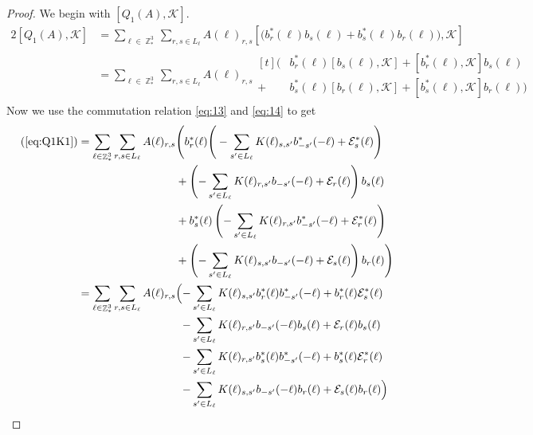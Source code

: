 \documentclass[sn-mathphys, Numbered ,a4paper]{sn-jnl}%
\DeclareMathOperator{\Z}{\mathbb{Z}}
\theoremstyle{plain}
\theoremstyle{definition}
\theoremstyle{remark}
\theoremstyle{plain}
\theoremstyle{definition}
\theoremstyle{remark}
\begin{document}
\begin{proof}We begin with $[Q_1(A),\mathcal{K}]$.
    \begin{alignat}{2}
        [ Q_1(A),\mathcal{K}] &=\sum\limits_{\ell \in \Z^3_*}\sum\limits_{r,s \in L_{\ell}}A(\ell)_{r,s}\left[\Big(b^*_{r}(\ell)b_{s}(\ell) + b^*_{s}(\ell)b_{r}(\ell)\Big),\mathcal{K}\right]\nonumber\\
        &=\sum\limits_{\ell \in \Z^3_*}\sum\limits_{r,s \in L_{\ell}}A(\ell)_{r,s}\begin{aligned}[t]
            \Big(&b^*_{r}(\ell)\left[b_{s}(\ell),\mathcal{K}\right] +\left[b^*_{r}(\ell),\mathcal{K}\right]b_{s}(\ell)\\ + &b^*_{s}(\ell)\left[b_{r}(\ell),\mathcal{K}\right]+ \left[b^*_{s}(\ell),\mathcal{K}\right]b_{r}(\ell)\Big)
        \end{aligned}\label{eq:Q1K1}
    \end{alignat}
Now we use the commutation relation \eqref{eq:13} and \eqref{eq:14} to get
\begin{alignat}{2}
    (\ref{eq:Q1K1})&=\sum\limits_{\ell \in \Z^3_*}\sum\limits_{r,s \in L_{\ell}}A(\ell)_{r,s}\begin{aligned}[t]
        &\Bigg(b^*_{r}(\ell)\Bigg(-\sum\limits_{s'\in L_{\ell}}K(\ell)_{s,s'}b^*_{-s'}(-\ell) + \mathcal{E}^*_{s}(\ell)\Bigg)\\ &+ \left(-\sum\limits_{s'\in L_{\ell}}K(\ell)_{r,s'}b_{-s'}(-\ell) + \mathcal{E}_{r}(\ell)\right)b_{s}(\ell)\\&+ b^*_{s}(\ell)\left(-\sum\limits_{s'\in L_{\ell}}K(\ell)_{r,s'}b^*_{-s'}(-\ell) + \mathcal{E}^*_{r}(\ell)\right)\\ &+ \left(-\sum\limits_{s'\in L_{\ell}}K(\ell)_{s,s'}b_{-s'}(-\ell) + \mathcal{E}_{s}(\ell)\right)b_{r}(\ell) \Bigg)        
    \end{aligned}\nonumber\\
    &=\sum\limits_{\ell \in \Z^3_*}\sum\limits_{r,s \in L_{\ell}}A(\ell)_{r,s}\begin{aligned}[t]
        \Big(-&\sum\limits_{s'\in L_{\ell}}K(\ell)_{s,s'}b^*_{r}(\ell)b^*_{-s'}(-\ell) +b^*_{r}(\ell) \mathcal{E}^*_{s}(\ell)\\ - &\sum\limits_{s'\in L_{\ell}}K(\ell)_{r,s'}b_{-s'}(-\ell)b_{s}(\ell) + \mathcal{E}_{r}(\ell)b_{s}(\ell)\\-&\sum\limits_{s'\in L_{\ell}} K(\ell)_{r,s'}b^*_{s}(\ell)b^*_{-s'}(-\ell) + b^*_{s}(\ell)\mathcal{E}^*_{r}(\ell)\\ - &\sum\limits_{s'\in L_{\ell}}K(\ell)_{s,s'}b_{-s'}(-\ell)b_{r}(\ell) + \mathcal{E}_{s}(\ell)b_{r}(\ell) \Big) 

\end{aligned}
\end{alignat}
\end{proof}
\end{document}
